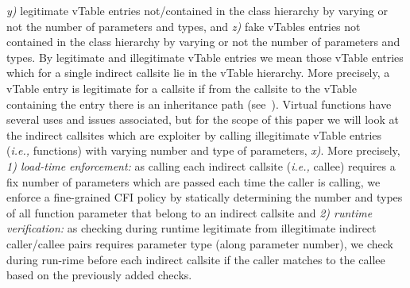 \textit{y)} legitimate vTable entries not/contained in the class hierarchy by varying or not the number of parameters and types, and 
\textit{z)} fake vTables entries not contained in the class hierarchy by varying or not the number of parameters and types.
By legitimate and illegitimate vTable entries we mean those 
vTable entries which for a single indirect callsite lie in the 
vTable hierarchy. More precisely, a vTable entry is legitimate for 
a callsite if from the callsite to the vTable containing the entry there
is an inheritance path (see~\cite{haller:shrinkwrap}).
Virtual functions have several uses and issues associated, 
but for the scope of this paper we will look at the indirect 
callsites which are exploiter by calling illegitimate vTable entries (\textit{i.e.,} functions)
with varying number and type of parameters, \textit{x)}.
More precisely, 
\textit{1) load-time enforcement:} as calling each indirect callsite (\textit{i.e.,} callee) requires 
a fix number of parameters which are passed each time the caller is calling, we
enforce a fine-grained CFI policy by statically determining the number and types of all function parameter
that belong to an indirect callsite and
\textit{2) runtime verification:} as checking during runtime legitimate from
illegitimate indirect caller/callee pairs requires parameter type (along parameter number),
we check during run-rime before each indirect callsite if the caller matches to the callee 
based on the previously added checks.

